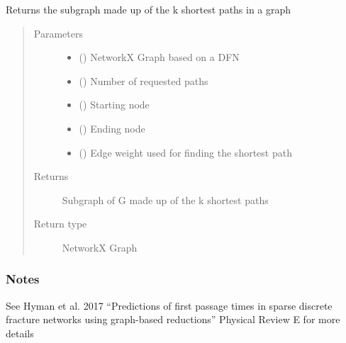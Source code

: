 \documentclass[letterpaper,10pt,english]{sphinxmanual}
\begin{document}

\begin{fulllineitems}
\label{\detokenize{pydfnworks:pydfnworks.dfnGraph.dfn2graph.k_shortest_paths_backbone}}
Returns the subgraph made up of the k shortest paths in a graph
\begin{quote}\begin{description}
\item[{Parameters}] \leavevmode\begin{itemize}
\item {} 
 () \textendash{} NetworkX Graph based on a DFN

\item {} 
 () \textendash{} Number of requested paths

\item {} 
 () \textendash{} Starting node

\item {} 
 () \textendash{} Ending node

\item {} 
 () \textendash{} Edge weight used for finding the shortest path

\end{itemize}

\item[{Returns}] \leavevmode
{} \textendash{} Subgraph of G made up of the k shortest paths

\item[{Return type}] \leavevmode
NetworkX Graph

\end{description}\end{quote}
\subsubsection*{Notes}

See Hyman et al. 2017 “Predictions of first passage times in sparse discrete fracture networks using graph-based reductions” Physical Review E for more details

\end{fulllineitems}
\end{document}
